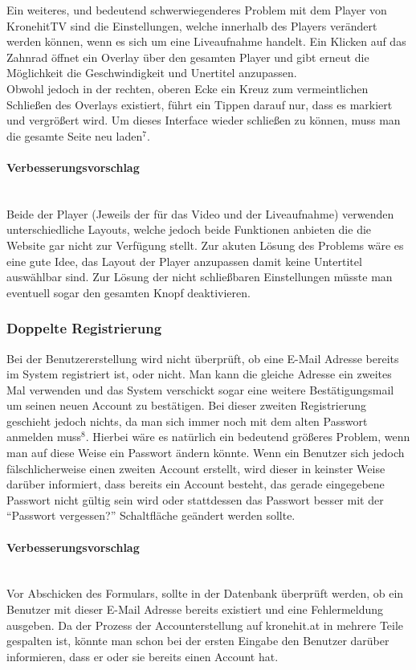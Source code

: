 \documentclass{article}
\newcommand{\paragraphlb}[1]{\paragraph{#1}\mbox{}\\}
\begin{document}
	Ein weiteres, und bedeutend schwerwiegenderes Problem mit dem Player von KronehitTV sind die Einstellungen, welche innerhalb des Players verändert werden können, wenn es sich um eine Liveaufnahme handelt. Ein Klicken auf das Zahnrad öffnet ein Overlay über den gesamten Player und gibt erneut die Möglichkeit die Geschwindigkeit und Unertitel anzupassen. \\

	Obwohl jedoch in der rechten, oberen Ecke ein Kreuz zum vermeintlichen Schließen des Overlays existiert, führt ein Tippen darauf nur, dass es markiert und vergrößert wird. Um dieses Interface wieder schließen zu können, muss man die gesamte Seite neu laden\hyperref[sec:Anhang7]{$^7$}\label{ssub:tvmobile2}.
	\paragraphlb{Verbesserungsvorschlag}
	Beide der Player (Jeweils der für das Video und der Liveaufnahme) verwenden unterschiedliche Layouts, welche jedoch beide Funktionen anbieten die die Website gar nicht zur Verfügung stellt. Zur akuten Lösung des Problems wäre es eine gute Idee, das Layout der Player anzupassen damit keine Untertitel auswählbar sind. Zur Lösung der nicht schließbaren Einstellungen müsste man eventuell sogar den gesamten Knopf deaktivieren. \\
	\vfill
	\subsubsection{Doppelte Registrierung}
	Bei der Benutzererstellung wird nicht überprüft, ob eine E-Mail Adresse bereits im System registriert ist, oder nicht. Man kann die gleiche Adresse ein zweites Mal verwenden und das System verschickt sogar eine weitere Bestätigungsmail um seinen neuen Account zu bestätigen. Bei dieser zweiten Registrierung geschieht jedoch nichts, da man sich immer noch mit dem alten Passwort anmelden muss\hyperref[sec:Anhang8]{$^8$}\label{ssub:register}. Hierbei wäre es natürlich ein bedeutend größeres Problem, wenn man auf diese Weise ein Passwort ändern könnte. Wenn ein Benutzer sich jedoch fälschlicherweise einen zweiten Account erstellt, wird dieser in keinster Weise darüber informiert, dass bereits ein Account besteht, das gerade eingegebene Passwort nicht gültig sein wird oder stattdessen das Passwort besser mit der \enquote{Passwort vergessen?} Schaltfläche geändert werden sollte.
	\paragraphlb{Verbesserungsvorschlag}
	Vor Abschicken des Formulars, sollte in der Datenbank überprüft werden, ob ein Benutzer mit dieser E-Mail Adresse bereits existiert und eine Fehlermeldung ausgeben. Da der Prozess der Accounterstellung auf kronehit.at in mehrere Teile gespalten ist, könnte man schon bei der ersten Eingabe den Benutzer darüber informieren, dass er oder sie bereits einen Account hat.
	\newpage
\end{document}

